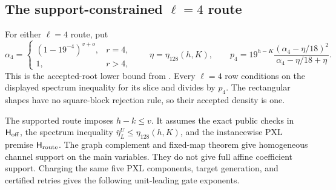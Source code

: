 \documentclass[11pt]{article}
\begin{document}
\subsection{The support-constrained \texorpdfstring{$\ell=4$}{ell=4} route}
\label{sec:pxl-l4-supported}

For either $\ell=4$ route, put
\begin{equation}
 \alpha_4=
 \begin{cases}
  (1-19^{-4})^{v+o},&r=4,\\
  1,&r>4,
 \end{cases}
 \qquad
 \eta=\eta_{128}(h,K),
 \qquad
 p_4=19^{h-K}\frac{(\alpha_4-\eta/18)^2}
                         {\alpha_4-\eta/18+\eta}.   \label{eq:pxl-l4-pdir}
\end{equation}
This is the accepted-root lower bound from .
Every $\ell=4$ row conditions on the displayed spectrum inequality for its
slice and divides by $p_4$.  The rectangular shapes have no square-block
rejection rule, so their accepted density is one.

The supported route imposes $h-k\le v$.  It assumes the exact public checks
in $\mathsf H_{\rm off}$, the spectrum inequality
$\bar\eta_L^U\le\eta_{128}(h,K)$, and the instancewise PXL premise
$\mathsf H_{\rm route}$.  The graph complement and fixed-map theorem give
homogeneous channel support on the main variables.  They do not give full
affine coefficient support.  Charging the same five PXL components, target
generation, and certified retries gives the following unit-leading gate
exponents.
\end{document}
